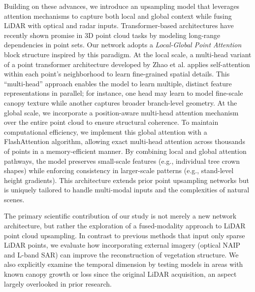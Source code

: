 \documentclass[preprints,article,accept,pdftex,moreauthors]{Definitions/mdpi}
\begin{document}
Building on these advances, we introduce an upsampling model that leverages attention mechanisms to capture both local and global context while fusing LiDAR with optical and radar inputs. Transformer-based architectures have recently shown promise in 3D point cloud tasks by modeling long-range dependencies in point sets. Our network adopts a \emph{Local-Global Point Attention} block structure inspired by this paradigm. At the local scale, a multi-head variant of a point transformer architecture developed by Zhao et al. \cite{zhao2021point} applies self-attention within each point’s neighborhood to learn fine-grained spatial details. This “multi-head” approach enables the model to learn multiple, distinct feature representations in parallel; for instance, one head may learn to model fine-scale canopy texture while another captures broader branch-level geometry. At the global scale, we incorporate a position-aware multi-head attention mechanism over the entire point cloud to ensure structural coherence. To maintain computational efficiency, we implement this global attention with a FlashAttention \cite{dao2022flashattention} algorithm, allowing exact multi-head attention across thousands of points in a memory-efficient manner. By combining local and global attention pathways, the model preserves small-scale features (e.g., individual tree crown shapes) while enforcing consistency in larger-scale patterns (e.g., stand-level height gradients). This architecture extends prior point upsampling networks but is uniquely tailored to handle multi-modal inputs and the complexities of natural scenes.

The primary scientific contribution of our study is not merely a new network architecture, but rather the exploration of a fused-modality approach to LiDAR point cloud upsampling. In contrast to previous methods that input only sparse LiDAR points, we evaluate how incorporating external imagery (optical NAIP and L-band SAR) can improve the reconstruction of vegetation structure. We also explicitly examine the temporal dimension by testing models in areas with known canopy growth or loss since the original LiDAR acquisition, an aspect largely overlooked in prior research.
\end{document}
